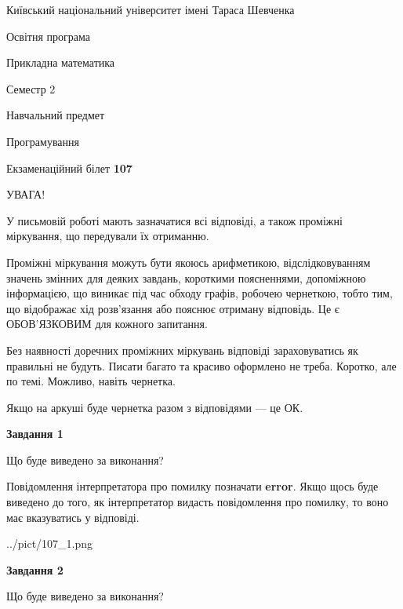 \documentclass[12pt, ukrainian]{article}
\begin{document}
{{\begin {small}\par
{ \center  Київський національний університет імені Тараса Шевченка \par}
{\parbox {5 cm}{Освітня програма \hfill}{\parbox {7 cm}{Прикладна математика \hfill}}\parbox {6 cm}{\hfill Семестр 2}}\par
{\parbox {5 cm} {Навчальний предмет \hfill}\parbox {7 cm}{Програмування \hfill}\parbox {6cm}{\hfill}\par}\vspace{-7pt} \end{small}}{\center Екзаменаційний білет \No \textbf
{ 107 }\par}}
{
\begin {large}
УВАГА!

У письмовій роботі мають зазначатися всі відповіді, а також проміжні міркування, що передували їх отриманню.

Проміжні міркування можуть бути якоюсь арифметикою, відслідковуванням зна\-чень змінних для деяких завдань,
короткими поясненнями, допоміжною інформацією, що виникає під час обходу графів, робочею чернеткою,
тобто тим, що відображає хід розв’язання або пояснює отриману відповідь.
Це є ОБОВ’ЯЗКОВИМ для кожного запитання.

Без наявності доречних проміжних міркувань відповіді зараховуватись як правиль\-ні не будуть.
Писати багато та красиво оформлено не треба. Коротко, але по темі. Можли\-во, навіть чернетка.

Якщо на аркуші буде чернетка разом з відповідями --- це ОК.

\newpage

{\begin {center}\textbf{Завдання 1}\end {center}}\par
Що буде виведено за виконання?

Повідомлення інтерпретатора про помилку позначати \textbf{error}.
Якщо щось буде виведено до того, як інтерпретатор видасть повідомлення про помилку, 
то воно має вказуватись у відповіді. \par


\begin{center}
	{../pict/107_1.png}
\end{center}
\newpage

{\begin {center}\textbf{Завдання 2}\end {center}}\par
Що буде виведено за виконання?


\end{large}}
\end{document}
